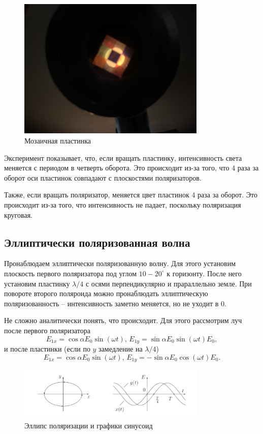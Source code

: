 \begin{figure}[H]
\centering
\includegraphics[width=0.80\textwidth]{IMG_3198.JPG}
\caption{Мозаичная пластинка}
\end{figure}

Эксперимент показывает, что, если вращать пластинку, интенсивность света меняется с периодом в четверть оборота. Это происходит из-за того, что 4 раза за оборот оси пластинок совпадают с плоскостями поляризаторов.

Также, если вращать поляризатор, меняется цвет пластинок 4 раза за оборот. Это происходит из-за того, что интенсивность не падает, поскольку поляризация круговая.


\subsection*{Эллиптически поляризованная волна}
Пронаблюдаем эллиптически поляризованную волну. Для этого установим плоскость первого поляризатора под углом $10-20^\circ$ к горизонту. После него установим пластинку $\lambda/4$ с осями перпендикулярно и прараллельно земле.
При повороте второго поляроида можно пронаблюдать эллиптическую поляризованность -- интенсивность заметно меняется, но не уходит в 0.

Не сложно аналитически понять, что происходит. Для этого рассмотрим луч после первого поляризатора
\[E_{1x} = \cos\alpha E_0 \sin(\omega t),\,E_{1y} = \sin\alpha E_0 \sin(\omega t) E_0,\]
и после пластинки (если по $y$ замедление на $\lambda / 4$)
\[E_{1x} = \cos\alpha E_0 \sin(\omega t),\,E_{1y} = - \sin\alpha E_0 \cos(\omega t) E_0.\]

\begin{figure}[H]
\includegraphics[width=0.8\textwidth]{ellipse.png}
\caption{Эллипс поляризации и графики синусоид}
\end{figure}

